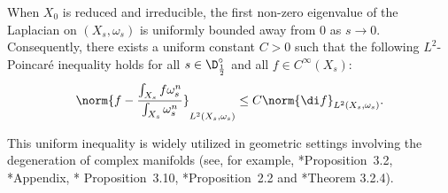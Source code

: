 \documentclass[12pt]{amsart}
\begin{document}
When $X_0$ is reduced and irreducible, 
the first non-zero eigenvalue of the Laplacian 
on $(X_s, \omega_s)$ is uniformly bounded away from $0$ as $s \to 0$.
Consequently, there exists a uniform constant $C > 0$ such that the 
following $L^2$-Poincaré inequality holds for all 
$s \in \D^\circ_{\frac{1}{2}}$ and all $f \in C^{\infty}(X_s)$:
\begin{equation}
    \label{eqn:uniform_poincare}
    \norm{f - \frac{\int_{X_s} f \omega_s^n}{\int_{X_s} \omega_s^n}}_{L^2(X_s, \omega_s)} \leq C \norm{\di f}_{L^2(X_s, \omega_s)}.
\end{equation}

This uniform inequality is widely utilized in geometric settings 
involving the degeneration of complex manifolds (see, for example, 
\cite{Ruan-Zhang2011}*{Proposition~3.2},  
\cite{CGP2021}*{Appendix}, \cite{DNGG2022}*
{Proposition~3.10}, \cite{Pan2022}*{Proposition~2.2}
and \cite{Filip-Tosatti21}*{Theorem 3.2.4}).
\end{document}
